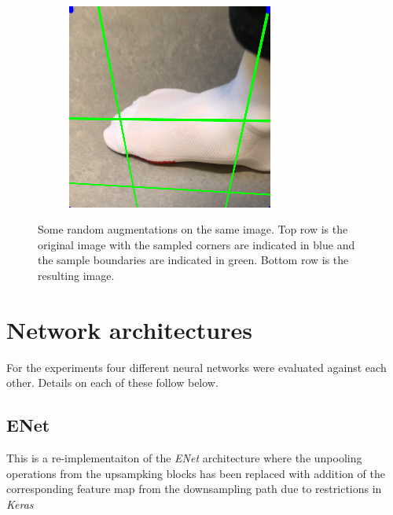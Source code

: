 \documentclass{kththesis}
\begin{document}
\begin{figure}[h]
\begin{subfigure}[b]{0.3\textwidth}
      \end{subfigure}
    ~
    \begin{subfigure}[b]{0.3\textwidth}
        \includegraphics[width=\textwidth]{augmented3}
      \end{subfigure}
      \caption{Some random augmentations on the same image. Top row is the
        original image with the sampled corners are indicated in blue and
        the sample boundaries are indicated in green. Bottom row is the
        resulting image.}\label{fig:augment}
\end{figure}


\section{Network architectures}
For the experiments four different neural networks were evaluated against each
other. Details on each of these follow below. %

\subsection{ENet}
This is a re-implementaiton of the  \textit{ENet} architecture
\parencite{paszke2016enet} where the unpooling operations from the upsampking
blocks has been replaced with addition of the corresponding feature map from the
downsampling path due to restrictions in \textit{Keras}
\end{document}
